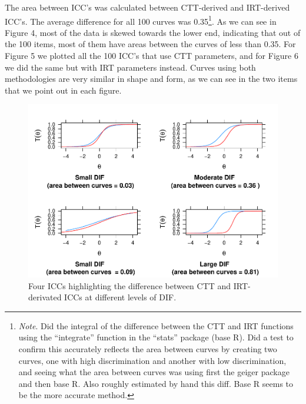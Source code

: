 \documentclass[
  man]{apa6}
\begin{document}
The area between ICC's was calculated between CTT-derived and IRT-derived ICC's. The average difference for all 100 curves was 0.35\footnote{\emph{Note}. Did the integral of the difference between the CTT and IRT functions using the ``integrate'' function in the ``stats'' package (base R). Did a test to confirm this accurately reflects the area between curves by creating two curves, one with high discrimination and another with low discrimination, and seeing what the area between curves was using first the geiger package and then base R. Also roughly estimated by hand this diff. Base R seems to be the more accurate method.}. As we can see in Figure 4, most of the data is skewed towards the lower end, indicating that out of the 100 items, most of them have areas between the curves of less than 0.35.
For Figure 5 we plotted all the 100 ICC's that use CTT parameters, and for Figure 6 we did the same but with IRT parameters instead. Curves using both methodologies are very similar in shape and form, as we can see in the two items that we point out in each figure.

\begin{figure}
\centering
\includegraphics{ICC_project_files/figure-latex/plotting-1.pdf}
\caption{\label{fig:plotting}Four ICCs highlighting the difference between CTT and IRT-derivated ICCs at different levels of DIF.}
\end{figure}
\end{document}
